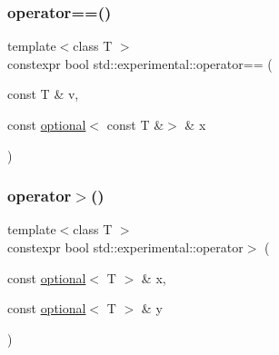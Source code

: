 \mbox{\label{namespacestd_1_1experimental_a9ff726fa7b981eeae6f6b8e98eb514ce}} 
\subsubsection{\texorpdfstring{operator==()}{operator==()}\hspace{0.1cm}{\footnotesize\ttfamily [9/9]}}
{\footnotesize\ttfamily template$<$class T $>$ \\
constexpr bool std\+::experimental\+::operator== (\begin{DoxyParamCaption}\item[{const T \&}]{v,  }\item[{const \mbox{\hyperlink{classstd_1_1experimental_1_1optional}{optional}}$<$ const T \&$>$ \&}]{x }\end{DoxyParamCaption})}

\mbox{\label{namespacestd_1_1experimental_a1d2409f0cb8fda0ec9a0b9d5e1e61cb5}} 
\subsubsection{\texorpdfstring{operator$>$()}{operator>()}\hspace{0.1cm}{\footnotesize\ttfamily [1/9]}}
{\footnotesize\ttfamily template$<$class T $>$ \\
constexpr bool std\+::experimental\+::operator$>$ (\begin{DoxyParamCaption}\item[{const \mbox{\hyperlink{classstd_1_1experimental_1_1optional}{optional}}$<$ T $>$ \&}]{x,  }\item[{const \mbox{\hyperlink{classstd_1_1experimental_1_1optional}{optional}}$<$ T $>$ \&}]{y }\end{DoxyParamCaption})}

\mbox{\label{namespacestd_1_1experimental_ab0139892916a389ed15c89675d5512ac}} 
